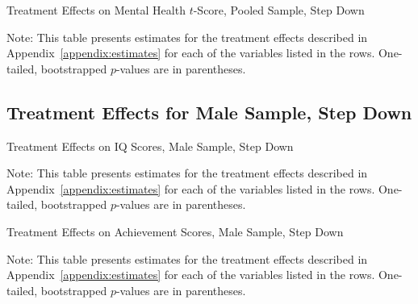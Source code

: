 	\begin{table}[H]
     \caption{Treatment Effects on Mental Health $t$-Score, Pooled Sample, Step Down}
     \label{table:abccare_rslt_pooled_cat16_sd}
	
	\end{table} 
\begin{spacing}{1}
\begin{footnotesize}
\noindent Note: This table presents estimates for the treatment effects described in Appendix~\ref{appendix:estimates} for each of the variables listed in the rows.  One-tailed, bootstrapped $p$-values are in parentheses.
\end{footnotesize}
\end{spacing}






\subsection{Treatment Effects for Male Sample, Step Down}

	\begin{table}[H]
     \caption{Treatment Effects on IQ Scores, Male Sample, Step Down}
     \label{table:abccare_rslt_male_cat0_sd}
	
	\end{table}
\begin{spacing}{1}
\begin{footnotesize}
\noindent Note: This table presents estimates for the treatment effects described in Appendix~\ref{appendix:estimates} for each of the variables listed in the rows.  One-tailed, bootstrapped $p$-values are in parentheses.
\end{footnotesize}
\end{spacing}

	\begin{table}[H]
     \caption{Treatment Effects on Achievement Scores, Male Sample, Step Down}
     \label{table:abccare_rslt_male_cat1_sd}
	
	\end{table} 
\begin{spacing}{1}
\begin{footnotesize}
\noindent Note: This table presents estimates for the treatment effects described in Appendix~\ref{appendix:estimates} for each of the variables listed in the rows.  One-tailed, bootstrapped $p$-values are in parentheses.
\end{footnotesize}
\end{spacing}

